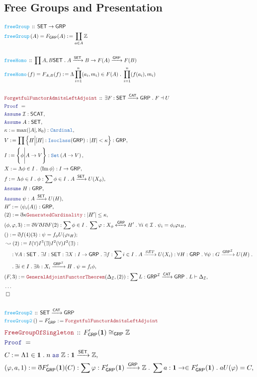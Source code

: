 \documentclass[12pt]{scrartcl}
\newcommand{\TYPE}[1]{\textcolor{NavyBlue}{\mathtt{#1}}}
\newcommand{\FUNC}[1]{\textcolor{Cerulean}{\mathtt{#1}}}
\newcommand{\LOGIC}[1]{\textcolor{Blue}{\mathtt{#1}}}
\newcommand{\THM}[1]{\textcolor{Maroon}{\mathtt{#1}}}
\renewcommand{\.}{\; . \;}
\newcommand{\de}{: \kern 0.1pc =}
\newcommand{\Act}[1]{\left( #1 \right)}
\newcommand{\Theorem}[2]{& \THM{#1} \, :: \, #2 \\ & \Proof = \\ }
\newcommand{\DeclareFunc}[2]{& \FUNC{#1} \, :: \, #2 \\}
\newcommand{\DefineNamedFunc}[4]{&  \FUNC{#1}\Act{#2} = #3 \de #4 \\}
\newcommand{\NewLine}{\\ & \kern 1pc}
\newcommand{\Page}[1]{ \begin{align*} #1 \end{align*}   }
\newcommand{ \bd }{ \ByDef }
\newcommand{\NoProof}{ & \ldots \\ \EndProof}
\newcommand{\Int}{\mathbb{Z} }
\DeclareMathOperator*{\im}{Im}
\newcommand{\Set}{\TYPE{Set}}
\newcommand{\Say}[3]{& #1 \de #2 : #3, \\}
\newcommand{\Conclude}[3]{& #1 \de #2 : #3; \\}
\newcommand{\Derive}[3]{& \leadsto #1 \de #2 : #3, \\}
\newcommand{\Assume}[2]{& \LOGIC{Assume} \; #1 : #2, \\}
\newcommand{\As}{\; \LOGIC{as } \;}
\newcommand{\QED}{\; \square}
\newcommand{\EndProof}{& \QED \\}
\newcommand{\ByDef}{\eth}
\newcommand{\Proof}{\LOGIC{Proof} \; }
\newcommand{\Arrow}[1]{\xrightarrow{#1}}
\newcommand{\ToIso}[1]{\xleftrightarrow{#1}}
\newcommand{\I}{\mathcal{I}}
\newcommand{\CAT}{\mathsf{CAT}}
\newcommand{\SET}{\mathsf{SET}}
\newcommand{\GRP}{\mathsf{GRP}}
\begin{document}
\subsection{Free Groups and Presentation}
\Page{  
	\DeclareFunc{freeGroup}{\SET \to \GRP}
	\DefineNamedFunc{freeGroup}{A}{F_\GRP(A)}{ \coprod_{a \in A} \Int  }
	\\
	\DeclareFunc{freeHomo}{ \prod A, B \SET \. A \Arrow{\SET} B \to F(A) \Arrow{\GRP} F(B)}
	\DefineNamedFunc{freeHomo}{f}{ F_{A,B}(f)}{ \Lambda \prod^n_{i = 1} (a_i, m_i) \in F(A) \. \prod^n_{i=1} (f(a_i),m_i) } 
	\\
	\Theorem{ForgetfulFunctorAdmitsLeftAdjoint}{ \exists F : \SET \Arrow{\CAT} \GRP \.  F \dashv U  }
	\Assume{\mathcal{I}}{\mathsf{SCAT}}
	\Assume{A}{\SET}
	\Say{\kappa}{\max(|A|, \aleph_0  ) }{\TYPE{Cardinal}}
	\Say{V}{\prod \Big\{ H \Big| [H] : \TYPE{Isoclass}(\GRP)  : |H| < \kappa  \Big\}}{\GRP}
	\Say{I}{ \left\{ \phi \Bigg| A \to V \right\}}
	{  \Set\left( A \to V    \right)    } 
	\Say{X}{\Lambda \phi \in I \. \left\langle  \im \phi \right\rangle}{I \to \GRP}
	\Say{f}{\Lambda   \phi \in I \.  \phi }
	{ \sum  \phi \in I \.   A \Arrow{\SET} U(X_\phi)  }
	\Assume{H}{\GRP}
	\Assume{\psi}{A \Arrow{\SET} U(H)}
	\Say{H'}{\left\langle   \psi_i(A) \right\rangle}{\GRP}  
	\Say{(2)}{\bd \kappa \THM{GeneratedCardinality}}{  \left|  H'  \right| \le \kappa }
	\Say{(\phi, \varphi ,3)}
	{ \bd V \bd I \bd F (2)  }{ \sum \phi \in I \.  \sum \varphi : X_\phi \ToIso{\GRP} H' \. \forall i \in \mathcal{I} \. \psi_i = \phi_i \varphi \iota_{H} }
	\Conclude{()}{\bd f(4)(3)}{ \psi = f_\phi U(\varphi \iota_H)}
	\Derive{(2)}{ I(\forall) I^{3}(\exists)I^2(\forall)I^2(\exists)}{ 
		\NewLine :
		\forall A : \SET \. 
		\exists I : \SET : \exists X : I \to \GRP \. \exists f : \sum i \in I \.  A \Arrow{SET} U(X_i) : 
		\forall H : \GRP \. \forall \psi : G \Arrow{\GRP^{\mathcal{I}}} U(H) \. \NewLine \.
		\exists i \in I \. \exists h :  X_i \Arrow{\GRP^\I}  H \. 
		\psi = f_i \phi 
	}
	\Say{(F,3) }{ \THM{GeneralAdjointFunctorTheorem}(\Delta_{\mathcal{\I}}, (2)) }
	{  \sum L  : \GRP^{\mathcal{I}} \Arrow{\mathsf{CAT}}  \GRP \. L \vdash \Delta_{\mathcal{\I}}    }
	\NoProof
	\\
	\DeclareFunc{freeGroup2}{\SET \Arrow{\CAT} \GRP}
	\DefineNamedFunc{freeGroup2}{}{F'_\GRP}{\THM{ForgetfulFunctorAdmitsLeftAdjoint}}
}\Page{
	\Theorem{FreeGroupOfSingleton}{ F_\GRP'(\mathbf{1}) \cong_\GRP \Int  }
	\Say{C}{ \Lambda 1 \in \mathbf{1} \. n \As \Int }{\mathbf{1} \Arrow{\SET} \Int }
	\Say{(\varphi,a,1)}{\bd F_\GRP'(\mathbf{1})(C)}{  \sum  \varphi : F'_\GRP(\mathbf{1}) \Arrow{\GRP} \Int \. \sum a : \mathbf{1} \to \in F'_\GRP(\mathbf{1})  \.  aU(\varphi) = C   }
}
\end{document}
